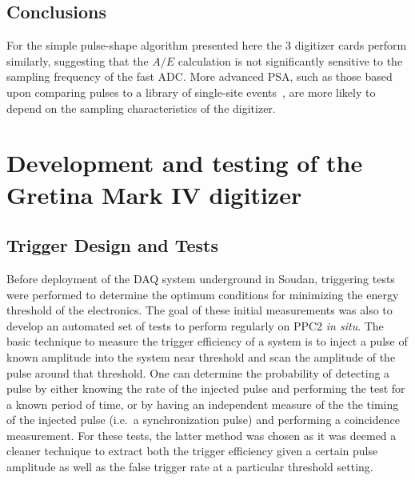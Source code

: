 		\subsection{Conclusions}
	     	\label{sec:HeadToHeadCompareConclusions}
		
	For the simple pulse-shape algorithm presented here the 3 digitizer cards perform similarly, suggesting that the $A/E$ calculation is not significantly sensitive to the sampling frequency of the fast ADC.  More advanced PSA, such as those based upon comparing pulses to a library of single-site events~\cite{Ren10}, are more likely to depend on the sampling characteristics of the digitizer.  

	\section{Development and testing of the Gretina Mark IV digitizer}
		\subsection{Trigger Design and Tests}
		\label{sec:DeploymentPPC2SoudanTriggerDesign}     
			
	Before deployment of the DAQ system underground in Soudan, triggering tests were performed to determine the optimum conditions for minimizing the energy threshold of the electronics.  The goal of these initial measurements was also to develop an automated set of tests to perform regularly on PPC2 \emph{in situ}.  The basic technique to measure the trigger efficiency of a system is to inject a pulse of known amplitude into the system near threshold and scan the amplitude of the pulse around that threshold.  One can determine the probability of detecting a pulse by either knowing the rate of the injected pulse and performing the test for a known period of time, or by having an independent measure of the the timing of the injected pulse (i.e.~a synchronization pulse) and performing a coincidence measurement.  For these tests, the latter method was chosen as it was deemed a cleaner technique to extract both the trigger efficiency given a certain pulse amplitude as well as the false trigger rate at a particular threshold setting.  
	
